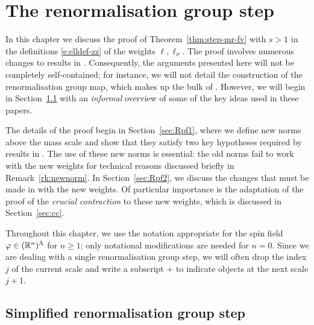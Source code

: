 \chapter{The renormalisation group step}
\label{sec:RGstep}

\setcounter{footnote}{0}

\renewcommand{\Vpt}{\Vp_\pt}


In this chapter we discuss the proof of Theorem~\ref{thm:step-mr-fv}
with $s > 1$ in the definitions \eqref{e:elldef-zz} of the weights
$\ell, \ell_\sigma$. The proof involves numerous changes
to results in \cite{BS-rg-loc,BS-rg-IE,BS-rg-step}.
Consequently, the arguments presented here will not be completely self-contained;
for instance, we will not detail the construction of the renormalisation group
map, which makes up the bulk of \cite{BS-rg-step}.
However, we will begin in Section~\ref{sec:rgmech} with an \emph{informal} overview
of some of the key ideas used in these papers.

The details of the proof begin in Section~\ref{sec:Rpf1}, where we define new
norms above the mass scale and show that they satisfy two key hypotheses required
by results in \cite{BS-rg-IE}. The use of these new norms is essential: the old
norms fail to work with the new weights for technical reasons discussed briefly
in Remark~\ref{rk:newnorm}. In Section~\ref{sec:Rpf2}, we discuss the changes that
must be made in \cite{BS-rg-loc,BS-rg-IE} with the new weights. Of particular
importance is the adaptation of the proof of the \emph{crucial contraction} to
these new weights, which is discussed in Section~\ref{sec:cc}.

Throughout this chapter, we use the notation appropriate for the spin field
$\varphi \in ({\mathbb R}^n)^\Lambda$ for $n \ge 1$; only notational modifications are
needed for $n=0$.
Since we are dealing with a single renormalisation group step, we will often
drop the index $j$ of the current scale and write a subscript $+$ to indicate
objects at the next scale $j + 1$.


\section{Simplified renormalisation group step}
\label{sec:rgmech}

